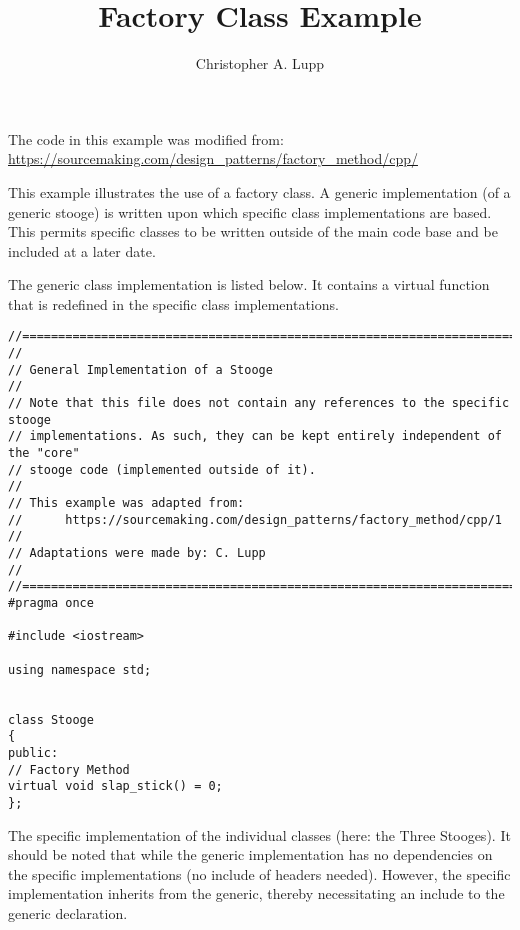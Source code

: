 \documentclass[]{scrartcl}
\title{Factory Class Example}
\author{Christopher A. Lupp}
\begin{document}
\maketitle


The code in this example was modified from: \url{https://sourcemaking.com/design\_patterns/factory\_method/cpp/}

This example illustrates the use of a factory class. A generic implementation (of a generic stooge) is written upon which specific class implementations are based. This permits specific classes to be written outside of the main code base and be included at a later date.

The generic class implementation is listed below. It contains a virtual function that is redefined in the specific class implementations.

\begin{lstlisting}[caption=stooge.h]
//==============================================================================
//
// General Implementation of a Stooge
//
// Note that this file does not contain any references to the specific stooge
// implementations. As such, they can be kept entirely independent of the "core"
// stooge code (implemented outside of it).
//
// This example was adapted from:
//      https://sourcemaking.com/design_patterns/factory_method/cpp/1 
//
// Adaptations were made by: C. Lupp
//
//==============================================================================
#pragma once

#include <iostream>

using namespace std;


class Stooge
{
public:
// Factory Method
virtual void slap_stick() = 0;
};
\end{lstlisting}


The specific implementation of the individual classes (here: the Three Stooges). It should be noted that while the generic implementation has no dependencies on the specific implementations (no include of headers needed). However, the specific implementation inherits from the generic, thereby necessitating an include to the generic declaration.
\end{document}
